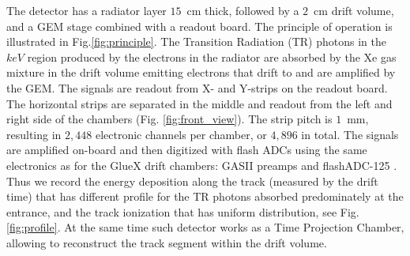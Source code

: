 \documentclass[%
preprint,
nofootinbib,
 amsmath,amssymb,
 aps,
floatfix,
]{revtex4-1}
\begin{document}
The detector has a radiator layer $15$~cm thick, followed 
by a $2$~cm drift volume, and a GEM stage combined with a readout board.
The principle of operation is illustrated in Fig.\ref{fig:principle}.
The Transition Radiation (TR) photons in the $keV$ region produced by the 
electrons in the radiator are absorbed by the Xe gas mixture in the drift volume
emitting electrons that drift to and are amplified by the GEM. 
The signals are readout from  X- and Y-strips on the readout board.
The horizontal strips are separated in the middle and readout 
from the left and right side of the chambers (Fig. \ref{fig:front_view}).
The strip pitch is $1$~mm, resulting in $2,448$ electronic channels
per chamber, or $4,896$ in total.
The signals are amplified on-board and then digitized with flash ADCs
using the same electronics as for the GlueX drift chambers: GASII \cite{GASII}
preamps and flashADC-125 \cite{fADC125}.
Thus we record the energy deposition along the track 
(measured by the drift time)
that has different profile for the TR photons
absorbed predominately at the entrance, and the track ionization 
that has uniform distribution, see Fig.\ref{fig:profile}. 
At the same time such detector works as a Time Projection Chamber,
allowing to reconstruct the track segment within the drift volume.
\end{document}
